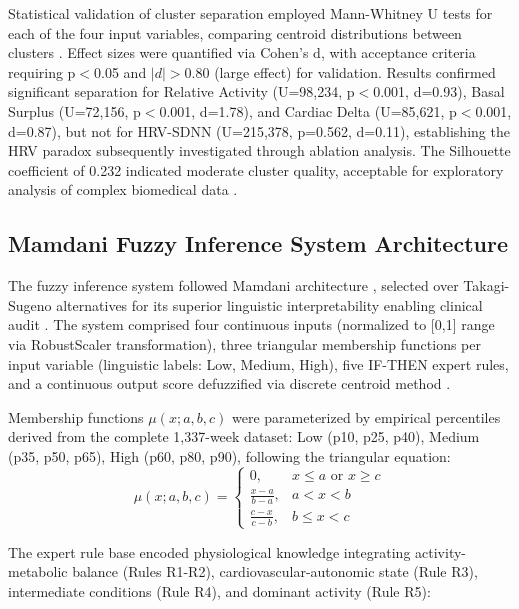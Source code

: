 \documentclass[journal,twoside,web]{ieeecolor}
\begin{document}
Statistical validation of cluster separation employed Mann-Whitney U tests for each of the four input variables, comparing centroid distributions between clusters \cite{Mann1947}. Effect sizes were quantified via Cohen's d, with acceptance criteria requiring p$<$0.05 and $|d| > 0.80$ (large effect) for validation. Results confirmed significant separation for Relative Activity (U=98,234, p$<$0.001, d=0.93), Basal Surplus (U=72,156, p$<$0.001, d=1.78), and Cardiac Delta (U=85,621, p$<$0.001, d=0.87), but not for HRV-SDNN (U=215,378, p=0.562, d=0.11), establishing the HRV paradox subsequently investigated through ablation analysis. The Silhouette coefficient of 0.232 indicated moderate cluster quality, acceptable for exploratory analysis of complex biomedical data \cite{Kaufman2005}.

\subsection{Mamdani Fuzzy Inference System Architecture}
\label{subsec:fuzzy_system}

The fuzzy inference system followed Mamdani architecture \cite{Mamdani1974}, selected over Takagi-Sugeno alternatives for its superior linguistic interpretability enabling clinical audit \cite{Czmil2023FuzzyClassifiers}. The system comprised four continuous inputs (normalized to [0,1] range via RobustScaler transformation), three triangular membership functions per input variable (linguistic labels: Low, Medium, High), five IF-THEN expert rules, and a continuous output score defuzzified via discrete centroid method \cite{Ross2010}.

Membership functions $\mu(x; a, b, c)$ were parameterized by empirical percentiles derived from the complete 1,337-week dataset: Low (p10, p25, p40), Medium (p35, p50, p65), High (p60, p80, p90), following the triangular equation:
\begin{equation}
\mu(x; a, b, c) = 
\begin{cases}
0, & x \leq a \text{ or } x \geq c \\
\frac{x-a}{b-a}, & a < x < b \\
\frac{c-x}{c-b}, & b \leq x < c
\end{cases}
\label{eq:membership}
\end{equation}

The expert rule base encoded physiological knowledge integrating activity-metabolic balance (Rules R1-R2), cardiovascular-autonomic state (Rule R3), intermediate conditions (Rule R4), and dominant activity (Rule R5):
\end{document}
